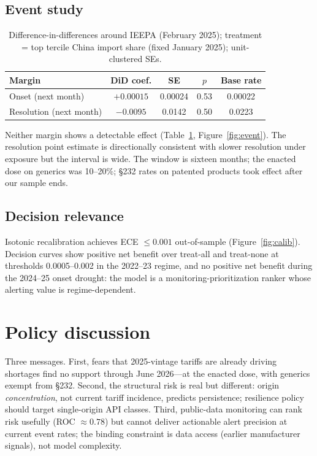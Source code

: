 \documentclass[11pt]{article}
\begin{document}
\subsection{Event study}\label{sec:event}
\begin{table}[H]\centering\small
\caption{Difference-in-differences around IEEPA (February 2025); treatment = top tercile China import share (fixed January 2025); unit-clustered SEs.}
\begin{tabular}{lcccc}
\toprule
Margin & DiD coef. & SE & $p$ & Base rate \\
\midrule
Onset (next month)      & $+0.00015$ & 0.00024 & 0.53 & 0.00022 \\
Resolution (next month) & $-0.0095$  & 0.0142  & 0.50 & 0.0223 \\
\bottomrule
\end{tabular}
\label{tab:event}
\end{table}
Neither margin shows a detectable effect (Table~\ref{tab:event}, Figure~\ref{fig:event}). The resolution point estimate is directionally consistent with slower resolution under exposure but the interval is wide. The window is sixteen months; the enacted dose on generics was 10--20\%; \S232 rates on patented products took effect after our sample ends.

\subsection{Decision relevance}
Isotonic recalibration achieves ECE $\le 0.001$ out-of-sample (Figure~\ref{fig:calib}). Decision curves show positive net benefit over treat-all and treat-none at thresholds 0.0005--0.002 in the 2022--23 regime, and no positive net benefit during the 2024--25 onset drought: the model is a monitoring-prioritization ranker whose alerting value is regime-dependent.

\section{Policy discussion}
Three messages. First, fears that 2025-vintage tariffs are already driving shortages find no support through June 2026---at the enacted dose, with generics exempt from \S232. Second, the structural risk is real but different: origin \emph{concentration}, not current tariff incidence, predicts persistence; resilience policy should target single-origin API classes. Third, public-data monitoring can rank risk usefully (ROC $\approx 0.78$) but cannot deliver actionable alert precision at current event rates; the binding constraint is data access (earlier manufacturer signals), not model complexity.
\end{document}
